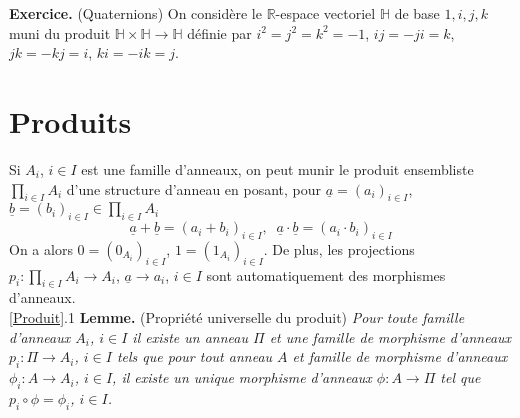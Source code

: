 \documentclass[a4paper, oneside, 12pt]{book}
\theoremstyle{theoremeStyle} %
\theoremstyle{definition} %
\newcommand{\C}{\mathbb{C}}
\newcommand{\R}{\mathbb{R}}
\newcommand{\HH}{\mathbb{H}}
\begin{document}
 \textbf{Exercice.} (Quaternions) On considère le $\R$-espace vectoriel $\HH$ de base $1,i,j,k$ muni du produit $\HH\times \HH\rightarrow \HH$ définie par $i^2=j^2=k^2=-1$, $ij=-ji=k$, $jk=-kj=i$, $ki=-ik=j$.

\section{Produits}\label{Produit (Anneaux)}\label{Produit} Si $A_i$, $i\in I$ est une famille d'anneaux, on peut munir le produit ensembliste $\prod_{i\in I}A_i$ d'une structure d'anneau en posant, pour $\underline{a}=(a_i)_{i\in I}$, $\underline{b}=(b_i)_{i\in I}\in \prod_{i\in I}A_i$
$$\underline{a}+\underline{b}=(a_i+b_i)_{i\in I},\;\; \underline{a}\cdot \underline{b}=(a_i\cdot b_i)_{i\in I}$$
On a alors $0 =(0_{A_i})_{i\in I}$, $1 =(1_{A_i})_{i\in I}$. De plus, les projections $p_i:\prod_{i\in I}A_i\rightarrow A_i$, $\underline{a}\rightarrow a_i$, $i\in I$ sont automatiquement des morphismes d'anneaux. \\

\ref{Produit}.1 \textbf{Lemme.} (Propriété universelle du produit) \textit{Pour toute famille d'anneaux $A_i$, $i\in I$ il existe un anneau $\Pi$ et une famille de morphisme d'anneaux $p_i:\Pi\rightarrow A_i$, $i\in I$ tels que pour tout anneau $A$ et famille de morphisme d'anneaux $\phi_i:A\rightarrow A_i$, $i\in I$, il existe un unique morphisme d'anneaux $\phi:A\rightarrow \Pi$ tel que $p_i\circ \phi=\phi_i$, $i\in I$. }
\end{document}
